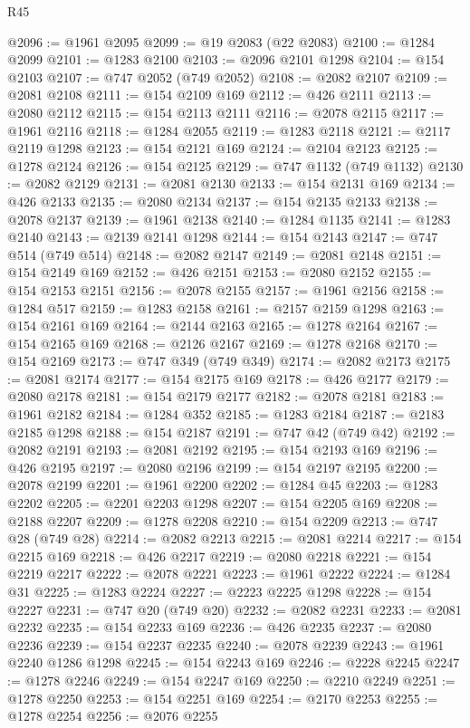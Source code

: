 \begin{lexlean}{R45}
\begin{coremodule}
@2096 := @1961 @2095
@2099 := @19 @2083 (@22 @2083)
@2100 := @1284 @2099
@2101 := @1283 @2100
@2103 := @2096 @2101 @1298
@2104 := @154 @2103
@2107 := @747 @2052 (@749 @2052)
@2108 := @2082 @2107
@2109 := @2081 @2108
@2111 := @154 @2109 @169
@2112 := @426 @2111
@2113 := @2080 @2112
@2115 := @154 @2113 @2111
@2116 := @2078 @2115
@2117 := @1961 @2116
@2118 := @1284 @2055
@2119 := @1283 @2118
@2121 := @2117 @2119 @1298
@2123 := @154 @2121 @169
@2124 := @2104 @2123
@2125 := @1278 @2124
@2126 := @154 @2125
@2129 := @747 @1132 (@749 @1132)
@2130 := @2082 @2129
@2131 := @2081 @2130
@2133 := @154 @2131 @169
@2134 := @426 @2133
@2135 := @2080 @2134
@2137 := @154 @2135 @2133
@2138 := @2078 @2137
@2139 := @1961 @2138
@2140 := @1284 @1135
@2141 := @1283 @2140
@2143 := @2139 @2141 @1298
@2144 := @154 @2143
@2147 := @747 @514 (@749 @514)
@2148 := @2082 @2147
@2149 := @2081 @2148
@2151 := @154 @2149 @169
@2152 := @426 @2151
@2153 := @2080 @2152
@2155 := @154 @2153 @2151
@2156 := @2078 @2155
@2157 := @1961 @2156
@2158 := @1284 @517
@2159 := @1283 @2158
@2161 := @2157 @2159 @1298
@2163 := @154 @2161 @169
@2164 := @2144 @2163
@2165 := @1278 @2164
@2167 := @154 @2165 @169
@2168 := @2126 @2167
@2169 := @1278 @2168
@2170 := @154 @2169
@2173 := @747 @349 (@749 @349)
@2174 := @2082 @2173
@2175 := @2081 @2174
@2177 := @154 @2175 @169
@2178 := @426 @2177
@2179 := @2080 @2178
@2181 := @154 @2179 @2177
@2182 := @2078 @2181
@2183 := @1961 @2182
@2184 := @1284 @352
@2185 := @1283 @2184
@2187 := @2183 @2185 @1298
@2188 := @154 @2187
@2191 := @747 @42 (@749 @42)
@2192 := @2082 @2191
@2193 := @2081 @2192
@2195 := @154 @2193 @169
@2196 := @426 @2195
@2197 := @2080 @2196
@2199 := @154 @2197 @2195
@2200 := @2078 @2199
@2201 := @1961 @2200
@2202 := @1284 @45
@2203 := @1283 @2202
@2205 := @2201 @2203 @1298
@2207 := @154 @2205 @169
@2208 := @2188 @2207
@2209 := @1278 @2208
@2210 := @154 @2209
@2213 := @747 @28 (@749 @28)
@2214 := @2082 @2213
@2215 := @2081 @2214
@2217 := @154 @2215 @169
@2218 := @426 @2217
@2219 := @2080 @2218
@2221 := @154 @2219 @2217
@2222 := @2078 @2221
@2223 := @1961 @2222
@2224 := @1284 @31
@2225 := @1283 @2224
@2227 := @2223 @2225 @1298
@2228 := @154 @2227
@2231 := @747 @20 (@749 @20)
@2232 := @2082 @2231
@2233 := @2081 @2232
@2235 := @154 @2233 @169
@2236 := @426 @2235
@2237 := @2080 @2236
@2239 := @154 @2237 @2235
@2240 := @2078 @2239
@2243 := @1961 @2240 @1286 @1298
@2245 := @154 @2243 @169
@2246 := @2228 @2245
@2247 := @1278 @2246
@2249 := @154 @2247 @169
@2250 := @2210 @2249
@2251 := @1278 @2250
@2253 := @154 @2251 @169
@2254 := @2170 @2253
@2255 := @1278 @2254
@2256 := @2076 @2255

\end{coremodule}
\end{lexlean}
